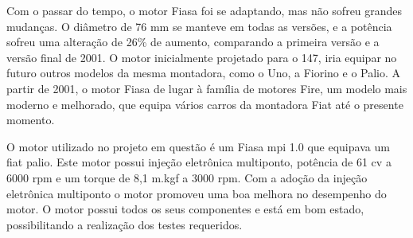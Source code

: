 	Com o passar do tempo, o motor Fiasa foi se adaptando, mas não sofreu grandes mudanças. O diâmetro de 76 mm se manteve em todas as versões, e a potência sofreu uma alteração de 26\% de aumento, comparando a primeira versão e a versão final de 2001. O motor inicialmente projetado para o 147, iria equipar no futuro outros modelos da mesma montadora, como o Uno, a Fiorino e o Palio. A partir de 2001, o motor Fiasa de lugar à família de motores Fire, um modelo mais moderno e melhorado, que equipa vários carros da montadora Fiat até o presente momento.
	
	O motor utilizado no projeto em questão é um Fiasa mpi 1.0 que equipava um fiat palio. Este motor possui injeção eletrônica multiponto, potência de 61 cv a 6000 rpm e um torque de 8,1 m.kgf a 3000 rpm. Com a adoção da injeção eletrônica multiponto o motor promoveu uma boa melhora no desempenho do motor. O motor possui todos os seus componentes e está em bom estado, possibilitando a realização dos testes requeridos.


